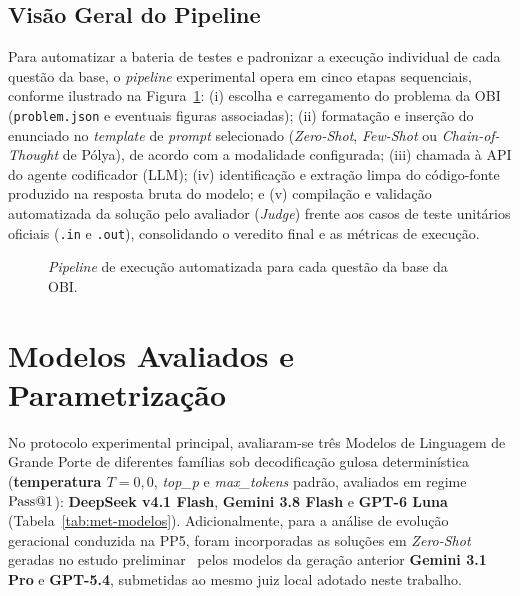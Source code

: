 \subsection{Visão Geral do Pipeline}\label{sec:met-visao-geral}

Para automatizar a bateria de testes e padronizar a execução individual de cada questão da base, o \textit{pipeline} experimental opera em cinco etapas sequenciais, conforme ilustrado na Figura~\ref{fig:met-pipeline}: (i) escolha e carregamento do problema da OBI (\texttt{problem.json} e eventuais figuras associadas); (ii) formatação e inserção do enunciado no \textit{template} de \textit{prompt} selecionado (\textit{Zero-Shot}, \textit{Few-Shot} ou \textit{Chain-of-Thought} de Pólya), de acordo com a modalidade configurada; (iii) chamada à API do agente codificador (LLM); (iv) identificação e extração limpa do código-fonte produzido na resposta bruta do modelo; e (v) compilação e validação automatizada da solução pelo avaliador (\textit{Judge}) frente aos casos de teste unitários oficiais (\texttt{.in} e \texttt{.out}), consolidando o veredito final e as métricas de execução.

\begin{figure}[!htbp]
\centering
\resizebox{\textwidth}{!}{}
\caption[Pipeline de execução automatizada para cada questão]{\textit{Pipeline} de execução automatizada para cada questão da base da OBI.}
\label{fig:met-pipeline}
\end{figure}
\FloatBarrier

\section{Modelos Avaliados e Parametrização}\label{sec:met-modelos}

No protocolo experimental principal, avaliaram-se três Modelos de Linguagem de Grande Porte de diferentes famílias sob decodificação gulosa determinística (\textbf{temperatura $T = 0{,}0$}, \textit{top\_p} e \textit{max\_tokens} padrão, avaliados em regime $\mathrm{Pass@}1$): \textbf{DeepSeek v4.1 Flash}, \textbf{Gemini 3.8 Flash} e \textbf{GPT-6 Luna} (Tabela~\ref{tab:met-modelos}). Adicionalmente, para a análise de evolução geracional conduzida na PP5, foram incorporadas as soluções em  \textit{Zero-Shot} geradas no estudo preliminar~\citep{angelo2026ise} pelos modelos da geração anterior \textbf{Gemini 3.1 Pro} e \textbf{GPT-5.4}, submetidas ao mesmo juiz local adotado neste trabalho.

